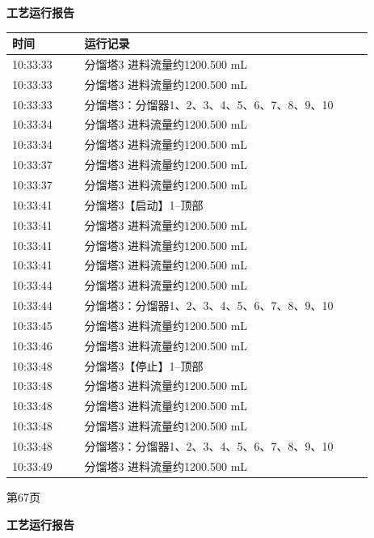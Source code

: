 \documentclass[UTF8,10pt,a4paper,fontset=fandol]{ctexart}
\begin{document}
\begin{center}
\begin{minipage}[t]{0.47\linewidth}
\centering
\textbf{工艺运行报告}

\smallskip
\begin{tabular}{|p{0.18\linewidth}|p{0.72\linewidth}|}
\hline
时间 & 运行记录 \\ \hline
10:33:33 & 分馏塔3 进料流量约1200.500 mL \\ \hline
10:33:33 & 分馏塔3 进料流量约1200.500 mL \\ \hline
10:33:33 & 分馏塔3：分馏器1、2、3、4、5、6、7、8、9、10 \\ \hline
10:33:34 & 分馏塔3 进料流量约1200.500 mL \\ \hline
10:33:34 & 分馏塔3 进料流量约1200.500 mL \\ \hline
10:33:37 & 分馏塔3 进料流量约1200.500 mL \\ \hline
10:33:37 & 分馏塔3 进料流量约1200.500 mL \\ \hline
10:33:41 & 分馏塔3【启动】1--顶部 \\ \hline
10:33:41 & 分馏塔3 进料流量约1200.500 mL \\ \hline
10:33:41 & 分馏塔3 进料流量约1200.500 mL \\ \hline
10:33:41 & 分馏塔3 进料流量约1200.500 mL \\ \hline
10:33:44 & 分馏塔3 进料流量约1200.500 mL \\ \hline
10:33:44 & 分馏塔3：分馏器1、2、3、4、5、6、7、8、9、10 \\ \hline
10:33:45 & 分馏塔3 进料流量约1200.500 mL \\ \hline
10:33:46 & 分馏塔3 进料流量约1200.500 mL \\ \hline
10:33:48 & 分馏塔3【停止】1--顶部 \\ \hline
10:33:48 & 分馏塔3 进料流量约1200.500 mL \\ \hline
10:33:48 & 分馏塔3 进料流量约1200.500 mL \\ \hline
10:33:48 & 分馏塔3 进料流量约1200.500 mL \\ \hline
10:33:48 & 分馏塔3：分馏器1、2、3、4、5、6、7、8、9、10 \\ \hline
10:33:49 & 分馏塔3 进料流量约1200.500 mL \\ \hline
\end{tabular}

\smallskip
第67页
\end{minipage}
\hfill
\begin{minipage}[t]{0.47\linewidth}
\centering
\textbf{工艺运行报告}


\end{minipage}
\end{center}
\end{document}
